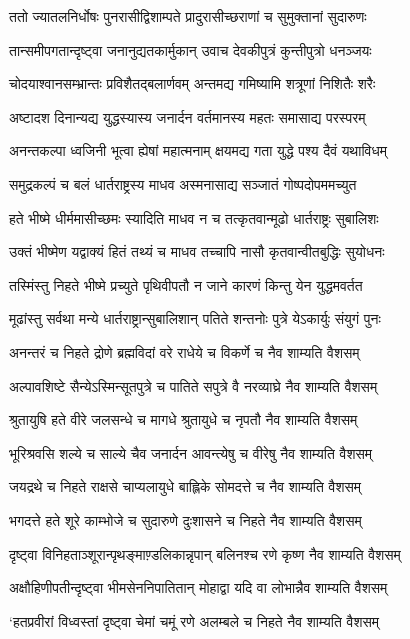 \twolineshloka
{ततो ज्यातलनिर्धोषः पुनरासीद्विशाम्पते}
{प्रादुरासीच्छराणां च सुमुक्तानां सुदारुणः}


\twolineshloka
{तान्समीपगतान्दृष्ट्वा जनानुद्यतकार्मुकान्}
{उवाच देवकीपुत्रं कुन्तीपुत्रो धनञ्जयः}


\twolineshloka
{चोदयाश्वानसम्भ्रान्तः प्रविशैतद्बलार्णवम्}
{अन्तमद्य गमिष्यामि शत्रूणां निशितैः शरैः}


\twolineshloka
{अष्टादश दिनान्यद्य युद्धस्यास्य जनार्दन}
{वर्तमानस्य महतः समासाद्य परस्परम्}


\twolineshloka
{अनन्तकल्पा ध्वजिनी भूत्वा ह्येषां महात्मनाम्}
{क्षयमद्य गता युद्धे पश्य दैवं यथाविधम्}


\twolineshloka
{समुद्रकल्पं च बलं धार्तराष्ट्रस्य माधव}
{अस्मनासाद्य सञ्जातं गोष्पदोपममच्युत}


\twolineshloka
{हते भीष्मे धीर्ममासीच्छमः स्यादिति माधव}
{न च तत्कृतवान्मूढो धार्तराष्ट्रः सुबालिशः}


\twolineshloka
{उक्तं भीष्मेण यद्वाक्यं हितं तथ्यं च माधव}
{तच्चापि नासौ कृतवान्वीतबुद्धिः सुयोधनः}


\twolineshloka
{तस्मिंस्तु निहते भीष्मे प्रच्युते पृथिवीपतौ}
{न जाने कारणं किन्तु येन युद्धमवर्तत}


\twolineshloka
{मूढांस्तु सर्वथा मन्ये धार्तराष्ट्रान्सुबालिशान्}
{पतिते शन्तनोः पुत्रे येऽकार्युः संयुगं पुनः}


\twolineshloka
{अनन्तरं च निहते द्रोणे ब्रह्मविदां वरे}
{राधेये च विकर्णे च नैव शाम्यति वैशसम्}


\twolineshloka
{अल्पावशिष्टे सैन्येऽस्मिन्सूतपुत्रे च पातिते}
{सपुत्रे वै नरव्याघ्रे नैव शाम्यति वैशसम्}


\twolineshloka
{श्रुतायुषि हते वीरे जलसन्धे च मागधे}
{श्रुतायुधे च नृपतौ नैव शाम्यति वैशसम्}


\twolineshloka
{भूरिश्रवसि शल्ये च साल्ये चैव जनार्दन}
{आवन्त्येषु च वीरेषु नैव शाम्यति वैशसम्}


\twolineshloka
{जयद्रथे च निहते राक्षसे चाप्यलायुधे}
{बाह्लिके सोमदत्ते च नैव शाम्यति वैशसम्}


\twolineshloka
{भगदत्ते हते शूरे काम्भोजे च सुदारुणे}
{दुःशासने च निहते नैव शाम्यति वैशसम्}


\twolineshloka
{दृष्ट्वा विनिहताञ्शूरान्पृथङ्माण़्डलिकान्नृपान्}
{बलिनश्च रणे कृष्ण नैव शाम्यति वैशसम्}


\twolineshloka
{अक्षौहिणीपतीन्दृष्ट्वा भीमसेननिपातितान्}
{मोहाद्वा यदि वा लोभान्नैव शाम्यति वैशसम्}


\twolineshloka
{`हतप्रवीरां विध्वस्तां दृष्ट्वा चेमां चमूं रणे}
{अलम्बले च निहते नैव शाम्यति वैशसम्}


